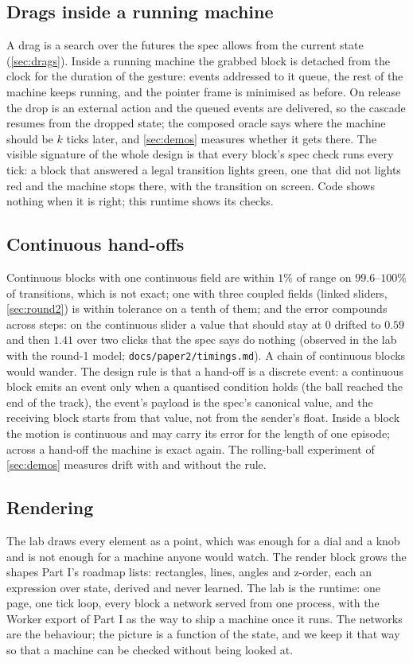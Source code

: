 \subsection{Drags inside a running machine}
\label{sec:livedrag}

A drag is a search over the futures the spec allows from the current state (\cref{sec:drags}). Inside a
running machine the grabbed block is detached from the clock for the duration of the gesture: events addressed
to it queue, the rest of the machine keeps running, and the pointer frame is minimised as before. On release
the drop is an external action and the queued events are delivered, so the cascade resumes from the dropped
state; the composed oracle says where the machine should be $k$ ticks later, and \cref{sec:demos} measures
whether it gets there. The visible signature of the whole design is that every block's spec check runs every
tick: a block that answered a legal transition lights green, one that did not lights red and the machine stops
there, with the transition on screen. Code shows nothing when it is right; this runtime shows its checks.

\subsection{Continuous hand-offs}
\label{sec:handoff}

Continuous blocks with one continuous field are within $1\%$ of range on $99.6$--$100\%$ of transitions, which
is not exact; one with three coupled fields (linked sliders, \cref{sec:round2}) is within tolerance on a tenth
of them; and the error compounds across steps: on the continuous slider a value that should stay at $0$ drifted to $0.59$ and then
$1.41$ over two clicks that the spec says do nothing (observed in the lab with the round-1 model;
\texttt{docs/paper2/timings.md}). A chain of continuous blocks would wander. The design rule
is that a hand-off is a discrete event: a continuous block emits an event only when a quantised condition holds
(the ball reached the end of the track), the event's payload is the spec's canonical value, and the receiving
block starts from that value, not from the sender's float. Inside a block the motion is continuous and may
carry its error for the length of one episode; across a hand-off the machine is exact again. The rolling-ball
experiment of \cref{sec:demos} measures drift with and without the rule.

\subsection{Rendering}
\label{sec:render}

The lab draws every element as a point, which was enough for a dial and a knob and is not enough for a
machine anyone would watch. The render block grows the shapes Part I's roadmap lists: rectangles, lines,
angles and z-order, each an expression over state, derived and never learned. The lab is the runtime: one page,
one tick loop, every block a network served from one process, with the Worker export of Part I as the way to
ship a machine once it runs. The networks are the behaviour; the picture is a function of the state, and we keep
it that way so that a machine can be checked without being looked at.
